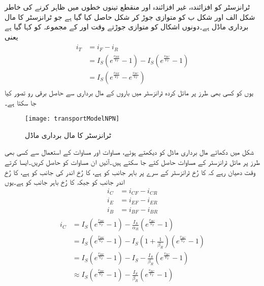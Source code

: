  ٹرانزسٹر کو افزائندہ، غیر افزائندہ اور منقطع تینوں خطوں میں ظاہر کرنے کی خاطر شکل  الف اور شکل  ب  کو متوازی جوڑ کر شکل   حاصل کیا گیا ہے جو  ٹرانزسٹر کا مال برداری ماڈل ہے۔دونوں اشکال کو متوازی جوڑتے وقت   اور   کے مجموعہ کو  کہا گیا ہے یعنی
\begin{gather}
\begin{aligned}
i_T &=i_F-i_R\\
&=I_S \left (e^{\frac{v_{BE}}{V_T}}-1 \right ) -I_S \left (e^{\frac{v_{BC}}{V_T}}-1 \right )\\
&=I_S \left (e^{\frac{v_{BE}}{V_T}}-e^{\frac{v_{
BC}}{V_T}} \right )
\end{aligned}
\end{gather}
یوں  کو کسی بھی طرز پر مائل کردہ ٹرانزسٹر میں باروں کے مال برداری سے حاصل برقی رو تصور کیا جا سکتا ہے۔
\begin{figure}
\centering
\texttt{[image: transportModelNPN]}
\caption{ ٹرانزسٹر کا مال برداری ماڈل}
\label{شکل_مال_برداری_ماڈل}
\end{figure}
شکل   میں دکھائے مال برداری ماڈل کو دیکھتے ہوئے، مساوات  اور مساوات  کے استعمال سے کسی بھی طرز پر مائل ٹرانزسٹر کے مساوات حاصل کئے جا سکتے ہیں۔آئیں ان مساوات کو حاصل کریں۔ایسا کرتے وقت دھیان رہے کہ  کا رُخ ٹرانزسٹر کے سرے پر باہر جانب کو ہے،   کا رُخ اندر کی جانب کو ہے،   کا رُخ اندر جانب کو  جبکہ   کا رُخ باہر جانب کو ہے۔یوں
\begin{align}
i_C&=i_{CF}-i_{CR}\\
i_E&=i_{EF}-i_{ER}\\
i_B&=i_{BF}-i_{BR}
\end{align}
%
\begin{gather} \label{مساوات_ٹرانزسٹر_چارجوں_کی_مال_برداری_اور_کلکٹر _رو}
\begin{aligned}
i_C&=I_S \left (e^{\frac{v_{BE}}{V_T}}-1 \right )-\frac{I_S}{\alpha_R} \left(e^{\frac{v_{BC}}{V_T}}-1 \right )\\
&=I_S \left (e^{\frac{v_{BE}}{V_T}}-1 \right ) -I_S \left (1+\frac{1}{\beta_R} \right ) \left (e^{\frac{v_{BC}}{V_T}}-1 \right )\\
&=I_S \left (e^{\frac{v_{BE}}{V_T}}-1 \right ) - I_S -\frac{I_S}{\beta_R} \left (e^{\frac{v_{BC}}{V_T}}-1 \right ) \\
&\approx  I_S \left (e^{\frac{v_{BE}}{V_T}}-1 \right )  -\frac{I_S}{\beta_R} \left (e^{\frac{v_{BC}}{V_T}}-1 \right )
\end{aligned}
\end{gather}
